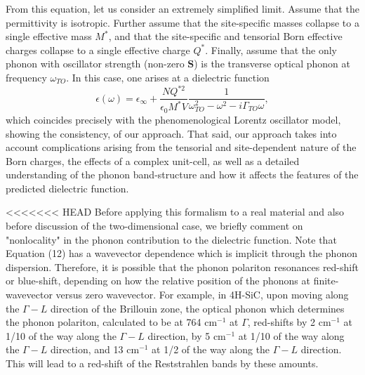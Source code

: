\documentclass[superscriptaddress,reprint,prb]{revtex4-1}
\begin{document}
From this equation, let us consider an extremely simplified limit. Assume that the permittivity is isotropic. Further assume that the site-specific masses collapse to a single effective mass $M^*$, and that the site-specific and tensorial Born effective charges collapse to a single effective charge $Q^*$. Finally, assume that the only phonon with oscillator strength (non-zero $\mathbf{S}$) is the transverse optical phonon at frequency $\omega_{TO}$. In this case, one arises at a dielectric function 
\begin{equation}
\epsilon(\omega) = \epsilon_{\infty} + \frac{NQ^{*2}}{\epsilon_0 M^*V}\frac{1}{\omega^2_{TO}-\omega^2-i\Gamma_{TO}\omega},
\end{equation}
which coincides precisely with the phenomenological Lorentz oscillator model, showing the consistency, of our approach. That said, our approach takes into account complications arising from the tensorial and site-dependent nature of the Born charges, the effects of a complex unit-cell, as well as a detailed understanding of the phonon band-structure and how it affects the features of the predicted dielectric function.

<<<<<<< HEAD
Before applying this formalism to a real material and also before discussion of the two-dimensional case, we briefly comment on "nonlocality" in the phonon contribution to the dielectric function. Note that Equation (12) has a wavevector dependence which is implicit through the phonon dispersion.  Therefore, it is possible that the phonon polariton resonances red-shift or blue-shift, depending on how the relative position of the phonons at finite-wavevector versus zero wavevector. For example, in 4H-SiC, upon moving along the $\Gamma-L$ direction of the Brillouin zone, the optical phonon which determines the phonon polariton, calculated to be at 764 cm$^{-1}$ at $\Gamma$, red-shifts by 2  cm$^{-1}$ at 1/10 of the way along the $\Gamma-L$ direction, by 5 cm$^{-1}$ at 1/10 of the way along the $\Gamma-L$ direction, and 13 cm$^{-1}$ at 1/2 of the way along the $\Gamma-L$ direction. This will lead to a red-shift of the Reststrahlen bands by these amounts.
\end{document}
